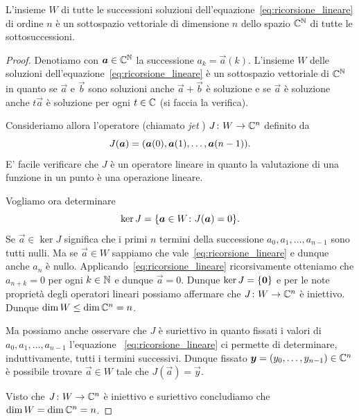\begin{theorem}
\label{th:dimensione_ricorsione_lineare}
L'insieme $W$ di tutte le successioni soluzioni dell'equazione~\eqref{eq:ricorsione_lineare}
di ordine $n$
è un sottospazio vettoriale di dimensione $n$
dello spazio ${\mathbb C}^{\mathbb N}$ di tutte le sottosuccessioni.
\end{theorem}
%
\begin{proof}
Denotiamo con $\boldsymbol a \in {\mathbb C}^{\mathbb N}$ la successione $a_k = \vec a(k)$.
L'insieme $W$ delle soluzioni dell'equazione~\eqref{eq:ricorsione_lineare}
è un sottospazio vettoriale di ${\mathbb C}^{\mathbb N}$ in quanto se $\vec a$
e $\vec b$ sono soluzioni anche $\vec a + \vec b$ è soluzione e se $\vec a$
è soluzione anche $t \vec a$ è soluzione per ogni $t\in {\mathbb C}$
(si faccia la verifica).

Consideriamo allora l'operatore (chiamato \emph{jet}%
) $J\colon W \to {\mathbb C}^n$
definito da
\[
  J(\boldsymbol a) = {\left( \boldsymbol a(0), \boldsymbol a(1), \dots, \boldsymbol a(n-1) \right)}.
\]
E' facile verificare che $J$ è un operatore lineare in quanto la valutazione
di una funzione in un punto è una operazione lineare.

Vogliamo ora determinare
\[
  \ker J = {\left\{ \boldsymbol a \in W \colon J(\boldsymbol a)=0 \right\}}.
\]
Se $\vec a\in \ker J$ significa che i primi $n$ termini
della successione
$a_0, a_1, \dots, a_{n-1}$ sono tutti nulli.
Ma se $\vec a\in W$ sappiamo che vale~\eqref{eq:ricorsione_lineare} e dunque
anche $a_n$ è nullo. Applicando~\eqref{eq:ricorsione_lineare} ricorsivamente
otteniamo che $a_{n+k}=0$ per ogni $k\in {\mathbb N}$ e dunque $\vec a = 0$.
Dunque $\ker J = {\left\{ \boldsymbol 0 \right\}}$
e per le note proprietà degli operatori lineari possiamo
affermare che $J\colon W \to {\mathbb C}^n$ è iniettivo.
Dunque $\dim W \le \dim {\mathbb C}^n = n$.

Ma possiamo anche osservare che $J$ è suriettivo in quanto
fissati i valori di $a_0,a_1, \dots, a_{n-1}$ l'equazione
~\eqref{eq:ricorsione_lineare} ci permette di determinare,
induttivamente, tutti i termini successivi. Dunque
fissato $\boldsymbol y = (y_0, \dots, y_{n-1}) \in {\mathbb C}^n$
è possibile trovare $\vec a \in W$ tale che $J(\vec a) = \vec y$.

Visto che $J\colon W\to{\mathbb C}^n$ è iniettivo e suriettivo
concludiamo che $\dim W = \dim {\mathbb C}^n = n$.
\end{proof}

